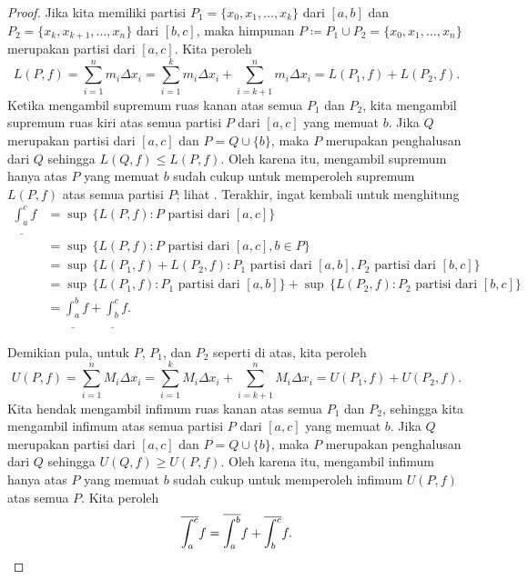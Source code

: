 \begin{proof}
Jika kita memiliki partisi $P_1 = \{ x_0,x_1,\ldots,x_k \}$
dari $[a,b]$ dan $P_2 = \{ x_k, x_{k+1}, \ldots, x_n \}$ dari $[b,c]$,
maka himpunan $P \coloneqq P_1 \cup P_2 = \{ x_0, x_1, \ldots, x_n \}$ merupakan
partisi dari $[a,c]$.  Kita peroleh
\begin{equation*}
L(P,f) =
\sum_{i=1}^n m_i \Delta x_i
=
\sum_{i=1}^k m_i \Delta x_i
+
\sum_{i=k+1}^n m_i \Delta x_i
=
L(P_1,f) + L(P_2,f) .
\end{equation*}
Ketika mengambil supremum ruas kanan atas semua $P_1$ dan $P_2$,
kita mengambil supremum ruas kiri
atas semua partisi $P$ dari $[a,c]$ yang memuat $b$.  Jika $Q$ merupakan partisi
dari $[a,c]$ dan $P = Q \cup \{ b \}$, maka $P$ merupakan penghalusan dari $Q$
sehingga $L(Q,f) \leq L(P,f)$.  Oleh karena itu, mengambil supremum hanya atas $P$
yang memuat $b$ sudah cukup untuk memperoleh supremum $L(P,f)$
atas semua partisi $P$; lihat .
Terakhir, ingat kembali 
untuk menghitung
\begin{equation*}
\begin{split}
\underline{\int_a^c} f
& =
\sup \, \bigl\{ L(P,f) : P \text{ partisi dari } [a,c] \bigr\}
\\
& =
\sup \, \bigl\{ L(P,f) : P \text{ partisi dari } [a,c], b \in P \bigr\}
\\
& =
\sup \, \bigl\{ L(P_1,f) + L(P_2,f) :
P_1 \text{ partisi dari } [a,b], P_2 \text{ partisi dari } [b,c] \bigr\}
\\
& =
\sup \, \bigl\{ L(P_1,f) : P_1 \text{ partisi dari } [a,b] \bigr\}
+
\sup \, \bigl\{ L(P_2,f) : P_2 \text{ partisi dari } [b,c] \bigr\}
\\
&=
\underline{\int_a^b} f + \underline{\int_b^c} f .
\end{split}
\end{equation*}

Demikian pula, untuk $P$, $P_1$, dan $P_2$ seperti di atas, kita peroleh
\begin{equation*}
U(P,f) =
\sum_{i=1}^n M_i \Delta x_i
=
\sum_{i=1}^k M_i \Delta x_i
+
\sum_{i=k+1}^n M_i \Delta x_i
=
U(P_1,f) + U(P_2,f) .
\end{equation*}
Kita hendak mengambil infimum ruas kanan
atas semua $P_1$ dan $P_2$, sehingga kita mengambil infimum
atas semua partisi $P$ dari $[a,c]$ yang memuat $b$.  Jika $Q$ merupakan partisi
dari $[a,c]$ dan $P = Q \cup \{ b \}$, maka $P$ merupakan penghalusan dari $Q$
sehingga $U(Q,f) \geq U(P,f)$.  Oleh karena itu, mengambil infimum hanya atas $P$
yang memuat $b$ sudah cukup untuk memperoleh infimum $U(P,f)$ atas
semua $P$.
Kita peroleh
\begin{equation*}
\overline{\int_a^c} f
=
\overline{\int_a^b} f + \overline{\int_b^c} f .  \qedhere
\end{equation*}
\end{proof}

